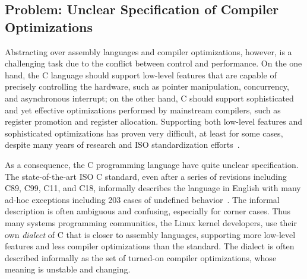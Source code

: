 



\subsection{Problem: Unclear Specification of Compiler Optimizations}
\label{sec:introduction:problem}

Abstracting over assembly languages and compiler optimizations, however, is a challenging task due
to the conflict between control and performance.  On the one hand, the C language should support
low-level features that are capable of precisely controlling the hardware, such as pointer
manipulation, concurrency, and asynchronous interrupt; on the other hand, C should support
sophisticated and yet effective optimizations performed by mainstream compilers, such as register
promotion and register allocation.  Supporting both low-level features and sophisticated
optimizations has proven very difficult, at least for some cases, despite many years of research and
ISO standardization efforts~\cite{c18}.

As a consequence, the C programming language have quite unclear specification.  The state-of-the-art
ISO C standard, even after a series of revisions including C89, C99, C11, and C18, informally
describes the language in English with many ad-hoc exceptions including 203 cases of undefined
behavior~\cite[J.2]{c18}.  The informal description is often ambiguous and confusing, especially for
corner cases.  Thus many systems programming communities, \eg{} the Linux kernel developers, use
their own \emph{dialect} of C that is closer to assembly languages, supporting more low-level
features and less compiler optimizations than the standard.  The dialect is often described
informally as the set of turned-on compiler optimizations, whose meaning is unstable and changing.

